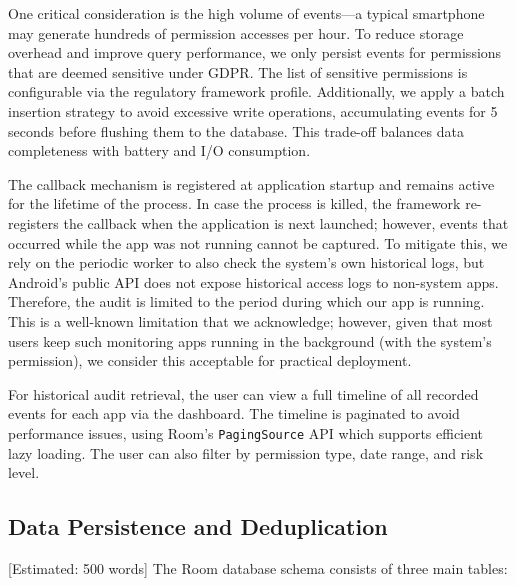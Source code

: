 One critical consideration is the high volume of events—a typical smartphone may generate hundreds of permission accesses per hour. To reduce storage overhead and improve query performance, we only persist events for permissions that are deemed sensitive under GDPR. The list of sensitive permissions is configurable via the regulatory framework profile. Additionally, we apply a batch insertion strategy to avoid excessive write operations, accumulating events for 5 seconds before flushing them to the database. This trade-off balances data completeness with battery and I/O consumption.

The callback mechanism is registered at application startup and remains active for the lifetime of the process. In case the process is killed, the framework re-registers the callback when the application is next launched; however, events that occurred while the app was not running cannot be captured. To mitigate this, we rely on the periodic worker to also check the system's own historical logs, but Android's public API does not expose historical access logs to non-system apps. Therefore, the audit is limited to the period during which our app is running. This is a well-known limitation that we acknowledge; however, given that most users keep such monitoring apps running in the background (with the system's permission), we consider this acceptable for practical deployment.

For historical audit retrieval, the user can view a full timeline of all recorded events for each app via the dashboard. The timeline is paginated to avoid performance issues, using Room's \texttt{PagingSource} API which supports efficient lazy loading. The user can also filter by permission type, date range, and risk level.

\subsection{Data Persistence and Deduplication} [Estimated: 500 words]
The Room database schema consists of three main tables:

